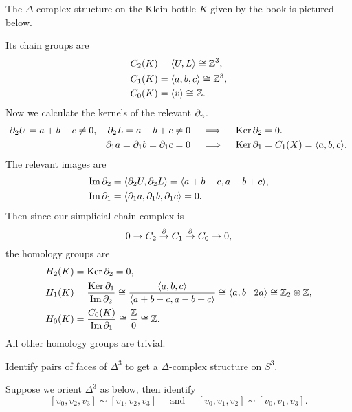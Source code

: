 \documentclass[twoside,10pt]{article}
\begin{document}
The $\Delta$-complex structure on the Klein bottle $K$ given by the book is pictured below.

\vspace{2in}

Its chain groups are
\begin{align*}
	C_2(K) &= \langle U,L \rangle \cong \mathbb{Z}^{3},\\
	C_1(K) &= \langle a,b,c \rangle \cong \mathbb{Z}^{3},\\
	C_0(K) &= \langle v \rangle \cong \mathbb{Z}.
\end{align*}
Now we calculate the kernels of the relevant $\partial_{n}{} $.
\begin{align*}
        \partial_{2}{U} = a+b-c \neq 0, \quad \partial_{2}{L} =a-b+c\neq 0 \quad &\implies \quad \operatorname{Ker} \partial_{2}{} = 0.\\
	\partial_{1}{a} =\partial_{1}{b} =\partial_{1}{c} = 0 \quad & \implies \quad \operatorname{Ker} \partial_{1}{} =C_1(X) = \langle a,b,c \rangle.
\end{align*}
The relevant images are
\begin{align*}
        \operatorname{Im} \partial_{2}{} &= \langle \partial_{2}{U},\partial_{2}{L} \rangle = \langle a+b-c,a-b+c \rangle,\\
        \operatorname{Im} \partial_{1}{} &= \langle \partial_{1}{a} ,\partial_{1}{b} ,\partial_{1}{c}  \rangle = 0.
\end{align*}
Then since our simplicial chain complex is
\[
0 \to C_2 \stackrel{\partial}{\to } C_1 \stackrel{\partial}{\to } C_0 \to 0,
\] the homology groups are
\begin{align*}
	H_2(K) &= \operatorname{Ker} \partial_2 = 0,\\
	H_1(K) &= \frac{\operatorname{Ker} \partial_1}{\operatorname{Im} \partial_2} \cong \frac{\langle a,b,c \rangle}{\langle a+b-c,a-b+c \rangle} \cong \langle a,b \;|\; 2a \rangle \cong \mathbb{Z}_2 \oplus \mathbb{Z},\\
	H_0(K) &= \frac{C_0(K)}{\operatorname{Im} \partial_1} \cong \frac{\mathbb{Z}}{0} \cong \mathbb{Z}.
\end{align*}
All other homology groups are trivial.

\newpage

\begin{exer}[2.1: 7]
Identify pairs of faces of $\Delta^{3}$ to get a $\Delta$-complex structure on $S^{3}$.
\end{exer}

Suppose we orient $\Delta^{3}$ as below, then identify
\[
	[v_0, v_2, v_3] \sim [v_1, v_2, v_3] \quad\text{ and }\quad [v_0, v_1, v_2] \sim [v_0, v_1, v_3].
\]

\vspace{2in}
\end{document}
